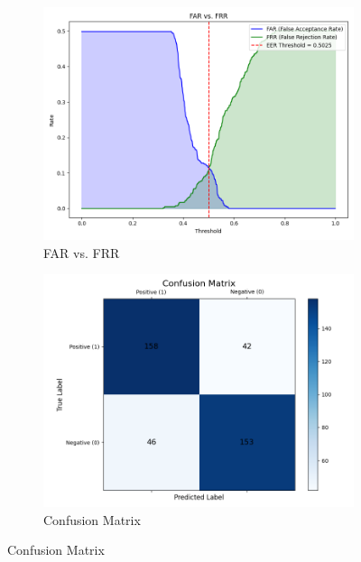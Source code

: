 \begin{figure}[!ht]
    \centering
    \begin{subfigure}[t]{0.48\columnwidth}
        \includegraphics[width=\textwidth]{./images/plots/ver/far_vs_frr.png}
        \caption{FAR vs. FRR}
        \label{fig:far_vs_frr}
    \end{subfigure}
    \hfill
    \begin{subfigure}[t]{0.48\columnwidth}
        \includegraphics[width=\textwidth]{./images/plots/ver/confusion_matrix.png}
        \caption{Confusion Matrix}
        \label{fig:confusion_matrix}
    \end{subfigure}
\end{figure}

